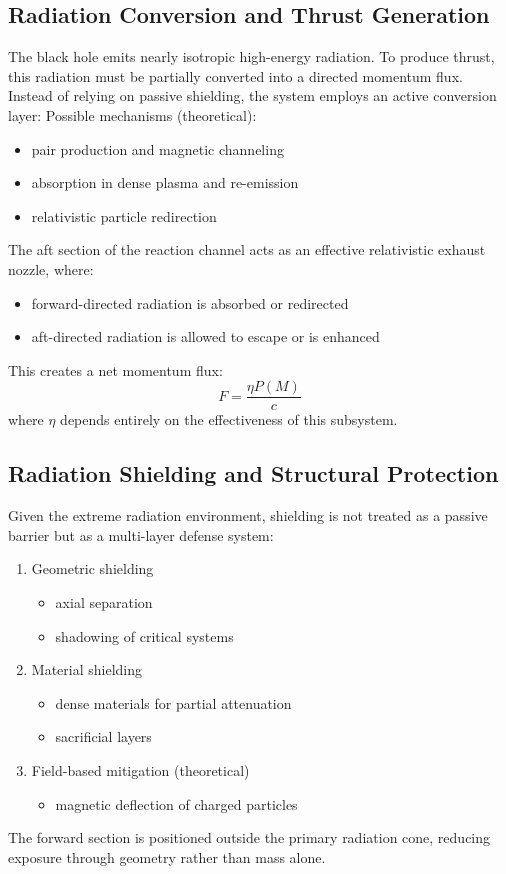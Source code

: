 \documentclass[conference]{IEEEtran}
\begin{document}
\subsection{Radiation Conversion and Thrust Generation}
The black hole emits nearly isotropic high-energy radiation. To produce thrust, this radiation must be partially converted into a directed momentum flux.
Instead of relying on passive shielding, the system employs an active conversion layer:
Possible mechanisms (theoretical):
\begin{itemize}
\item pair production and magnetic channeling
\item absorption in dense plasma and re-emission
\item relativistic particle redirection
\end{itemize}
The aft section of the reaction channel acts as an effective relativistic exhaust nozzle, where:
\begin{itemize}
\item forward-directed radiation is absorbed or redirected
\item aft-directed radiation is allowed to escape or is enhanced
\end{itemize}
This creates a net momentum flux:
\begin{equation}
F=\frac{\eta P(M)}{c}
\end{equation}
where \( \eta \) depends entirely on the effectiveness of this subsystem.
\subsection{Radiation Shielding and Structural Protection}
Given the extreme radiation environment, shielding is not treated as a passive barrier but as a multi-layer defense system:
\begin{enumerate}
\item Geometric shielding\begin{itemize}\item axial separation\item shadowing of critical systems\end{itemize}
\item Material shielding\begin{itemize}\item dense materials for partial attenuation\item sacrificial layers\end{itemize}
\item Field-based mitigation (theoretical)\begin{itemize}\item magnetic deflection of charged particles\end{itemize}
\end{enumerate}
The forward section is positioned outside the primary radiation cone, reducing exposure through geometry rather than mass alone.
\end{document}
